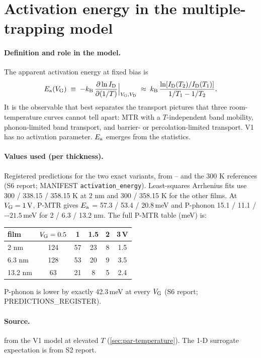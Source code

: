 \section{Activation energy in the multiple-trapping model}\label{sec:der-activation}

\paragraph{Definition and role in the model.}
The apparent activation energy at fixed bias is
\begin{equation}
  E_{\mathrm{a}}(V_{\mathrm{G}}) \;\equiv\; -k_{\mathrm{B}}\,\frac{\partial\ln I_{\mathrm{D}}}{\partial(1/T)}\Big|_{V_{\mathrm{G}},V_{\mathrm{D}}}
  \;\approx\; k_{\mathrm{B}}\,\frac{\ln\!\left[I_{\mathrm{D}}(T_2)/I_{\mathrm{D}}(T_1)\right]}{1/T_1-1/T_2}.
  \label{eq:d2-ea}
\end{equation}
It is the observable that best separates the transport pictures that three room-temperature curves cannot tell apart: MTR with a $T$-independent band mobility, phonon-limited band transport, and barrier- or percolation-limited transport. V1 has no activation parameter. $E_{\mathrm{a}}$ emerges from the statistics.

\paragraph{Values used (per thickness).}
Registered predictions for the two exact variants, from -- and the 300 K references (S6 report; MANIFEST \texttt{activation\_energy}). Least-squares Arrhenius fits use 300 / 338.15 / 358.15 K at 2 nm and 300 / 358.15 K for the other films. At $V_{\mathrm{G}}=\SI{1}{V}$, P-MTR gives $E_{\mathrm{a}}$ = 57.3 / 53.4 / 20.8\,meV and P-phonon 15.1 / 11.1 / $-21.5$\,meV for 2 / 6.3 / 13.2 nm. The full P-MTR table (meV) is:
\begin{center}
\small
\begin{tabular}{@{}lccccc@{}}
\toprule
film & $V_{\mathrm{G}}=0.5$ & 1 & 1.5 & 2 & 3\,V \\
\midrule
2 nm   & 124 & 57 & 23 & 8 & 1.5 \\
6.3 nm & 128 & 53 & 20 & 9 & 3.5 \\
13.2 nm & 63 & 21 & 8 & 5 & 2.4 \\
\bottomrule
\end{tabular}
\end{center}
P-phonon is lower by exactly 42.3\,meV at every $V_{\mathrm{G}}$ (S6 report; PREDICTIONS\_REGISTER).

\paragraph{Source.}
 from the V1 model at elevated $T$ (\cref{sec:par-temperature}). The 1-D surrogate expectation is from S2 report.

